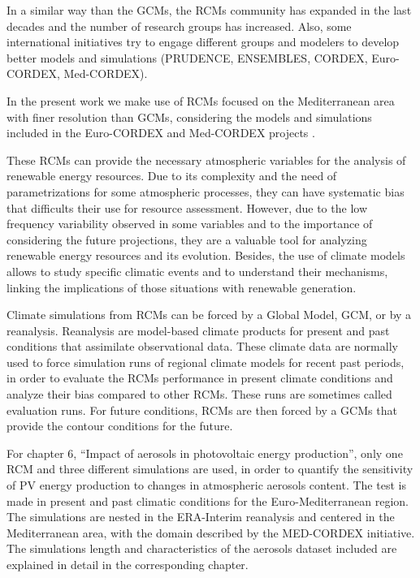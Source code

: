 In a similar way than the GCMs, the RCMs community has expanded in the last decades and the number of research groups has increased. Also, some international initiatives try to engage different groups and modelers to develop better models and simulations (PRUDENCE, ENSEMBLES, CORDEX, Euro-CORDEX, Med-CORDEX).

In the present work we make use of RCMs focused on the Mediterranean area with finer resolution than GCMs, considering the models and simulations included in the Euro-CORDEX and Med-CORDEX projects \cite*{Jacob2014, Ruti2016}.

These RCMs can provide the necessary atmospheric variables for the analysis of renewable energy resources. Due to its complexity and the need of parametrizations for some atmospheric processes, they can have systematic bias that difficults their use for resource assessment. However, due to the low frequency variability observed in some variables and to the importance of considering the future projections, they are a valuable tool for analyzing renewable energy resources and its evolution. Besides, the use of climate models allows to study specific climatic events and to understand their mechanisms, linking the implications of those situations with renewable generation.

Climate simulations from RCMs can be forced by a Global Model, GCM, or by a reanalysis. Reanalysis are model-based climate products for present and past conditions that assimilate observational data. These climate data are normally used to force simulation runs of regional climate models for recent past periods, in order to evaluate the RCMs performance in present climate conditions and analyze their bias compared to other RCMs. These runs are sometimes called evaluation runs. For future conditions, RCMs are then forced by a GCMs that provide the contour conditions for the future.  

For chapter 6, ``Impact of aerosols in photovoltaic energy production'', only one RCM and three different simulations are used, in order to quantify the sensitivity of PV energy production to changes in atmospheric aerosols content. The test is made in present and past climatic conditions for the Euro-Mediterranean region. The simulations are nested in the ERA-Interim reanalysis and centered in the Mediterranean area, with the domain described by the MED-CORDEX initiative. The simulations length and characteristics of the aerosols dataset included are explained in detail in the corresponding chapter.
 
